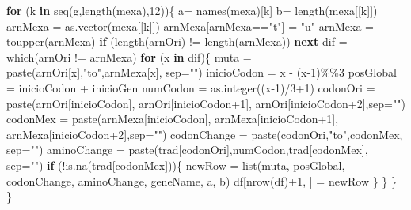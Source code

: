 \documentclass[
]{article}
\newenvironment{Shaded}{\begin{snugshade}}{\end{snugshade}}
\newcommand{\AttributeTok}[1]{\textcolor[rgb]{0.77,0.63,0.00}{#1}}
\newcommand{\ControlFlowTok}[1]{\textcolor[rgb]{0.13,0.29,0.53}{\textbf{#1}}}
\newcommand{\DecValTok}[1]{\textcolor[rgb]{0.00,0.00,0.81}{#1}}
\newcommand{\FunctionTok}[1]{\textcolor[rgb]{0.00,0.00,0.00}{#1}}
\newcommand{\NormalTok}[1]{#1}
\newcommand{\OtherTok}[1]{\textcolor[rgb]{0.56,0.35,0.01}{#1}}
\newcommand{\SpecialCharTok}[1]{\textcolor[rgb]{0.00,0.00,0.00}{#1}}
\newcommand{\StringTok}[1]{\textcolor[rgb]{0.31,0.60,0.02}{#1}}
\begin{document}
\begin{Shaded}
\begin{Highlighting}[]
  \ControlFlowTok{for}\NormalTok{ (k }\ControlFlowTok{in} \FunctionTok{seq}\NormalTok{(g,}\FunctionTok{length}\NormalTok{(mexa),}\DecValTok{12}\NormalTok{))\{}
\NormalTok{    a}\OtherTok{=} \FunctionTok{names}\NormalTok{(mexa)[k]}
\NormalTok{    b}\OtherTok{=} \FunctionTok{length}\NormalTok{(mexa[[k]])}
\NormalTok{    arnMexa }\OtherTok{=} \FunctionTok{as.vector}\NormalTok{(mexa[[k]])}
\NormalTok{    arnMexa[arnMexa}\SpecialCharTok{==}\StringTok{"t"}\NormalTok{] }\OtherTok{=} \StringTok{"u"}
\NormalTok{    arnMexa }\OtherTok{=} \FunctionTok{toupper}\NormalTok{(arnMexa)}
    \ControlFlowTok{if}\NormalTok{ (}\FunctionTok{length}\NormalTok{(arnOri) }\SpecialCharTok{!=} \FunctionTok{length}\NormalTok{(arnMexa)) }\ControlFlowTok{next}
\NormalTok{    dif }\OtherTok{=} \FunctionTok{which}\NormalTok{(arnOri }\SpecialCharTok{!=}\NormalTok{ arnMexa) }
    \ControlFlowTok{for}\NormalTok{ (x }\ControlFlowTok{in}\NormalTok{ dif)\{}
\NormalTok{      muta }\OtherTok{=} \FunctionTok{paste}\NormalTok{(arnOri[x],}\StringTok{"to"}\NormalTok{,arnMexa[x], }\AttributeTok{sep=}\StringTok{""}\NormalTok{) }
\NormalTok{      inicioCodon }\OtherTok{=}\NormalTok{ x }\SpecialCharTok{{-}}\NormalTok{ (x}\DecValTok{{-}1}\NormalTok{)}\SpecialCharTok{\%\%}\DecValTok{3} 
\NormalTok{      posGlobal }\OtherTok{=}\NormalTok{ inicioCodon }\SpecialCharTok{+}\NormalTok{ inicioGen}
\NormalTok{      numCodon }\OtherTok{=} \FunctionTok{as.integer}\NormalTok{((x}\DecValTok{{-}1}\NormalTok{)}\SpecialCharTok{/}\DecValTok{3}\SpecialCharTok{+}\DecValTok{1}\NormalTok{) }
\NormalTok{      codonOri }\OtherTok{=} \FunctionTok{paste}\NormalTok{(arnOri[inicioCodon], arnOri[inicioCodon}\SpecialCharTok{+}\DecValTok{1}\NormalTok{], arnOri[inicioCodon}\SpecialCharTok{+}\DecValTok{2}\NormalTok{],}\AttributeTok{sep=}\StringTok{""}\NormalTok{)}
\NormalTok{      codonMex }\OtherTok{=} \FunctionTok{paste}\NormalTok{(arnMexa[inicioCodon], arnMexa[inicioCodon}\SpecialCharTok{+}\DecValTok{1}\NormalTok{], arnMexa[inicioCodon}\SpecialCharTok{+}\DecValTok{2}\NormalTok{],}\AttributeTok{sep=}\StringTok{""}\NormalTok{)}
\NormalTok{      codonChange }\OtherTok{=} \FunctionTok{paste}\NormalTok{(codonOri,}\StringTok{"to"}\NormalTok{,codonMex, }\AttributeTok{sep=}\StringTok{""}\NormalTok{)}
\NormalTok{      aminoChange }\OtherTok{=} \FunctionTok{paste}\NormalTok{(trad[codonOri],numCodon,trad[codonMex], }\AttributeTok{sep=}\StringTok{""}\NormalTok{)}
      \ControlFlowTok{if}\NormalTok{ (}\SpecialCharTok{!}\FunctionTok{is.na}\NormalTok{(trad[codonMex]))\{}
\NormalTok{        newRow }\OtherTok{=} \FunctionTok{list}\NormalTok{(muta, posGlobal, codonChange, aminoChange, geneName, a, b)}
\NormalTok{        df[}\FunctionTok{nrow}\NormalTok{(df)}\SpecialCharTok{+}\DecValTok{1}\NormalTok{, ] }\OtherTok{=}\NormalTok{ newRow}
\NormalTok{      \}}
\NormalTok{    \}}
\NormalTok{  \}}
\NormalTok{\}}
\end{Highlighting}
\end{Shaded}
\end{document}
